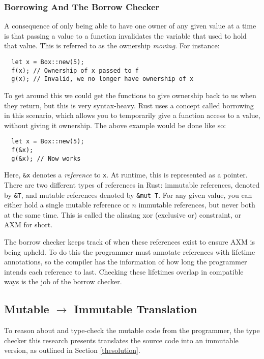 \documentclass[12pt,twoside]{report}
\begin{document}
\subsubsection{Borrowing And The Borrow Checker}
A consequence of only being able to have one owner of any given value at a time is that passing a value to a function invalidates the variable that used to hold that value. This is referred to as the ownership \textit{moving}. For instance:

\begin{lstlisting}
  let x = Box::new(5);
  f(x); // Ownership of x passed to f
  g(x); // Invalid, we no longer have ownership of x
\end{lstlisting}

To get around this we could get the functions to give ownership back to us when they return, but this is very syntax-heavy. Rust uses a concept called borrowing in this scenario, which allows you to temporarily give a function access to a value, without giving it ownership. The above example would be done like so:

\begin{lstlisting}
  let x = Box::new(5);
  f(&x);
  g(&x); // Now works
\end{lstlisting}

Here, \verb|&x| denotes a \textit{reference} to \verb|x|. At runtime, this is represented as a pointer. There are two different types of references in Rust: immutable references, denoted by \verb|&T|, and mutable references denoted by \verb|&mut T|. For any given value, you can either hold a single mutable reference or $n$ immutable references, but never both at the same time. This is called the aliasing xor (exclusive or) constraint, or AXM for short.

The borrow checker keeps track of when these references exist to ensure AXM is being upheld. To do this the programmer must annotate references with lifetime annotations, so the compiler has the information of how long the programmer intends each reference to last. Checking these lifetimes overlap in compatible ways is the job of the borrow checker.

\subsection{Mutable $\rightarrow$ Immutable Translation}
To reason about and type-check the mutable code from the programmer, the type checker this research presents translates the source code into an immutable version, as outlined in Section \ref{thesolution}.
\end{document}
